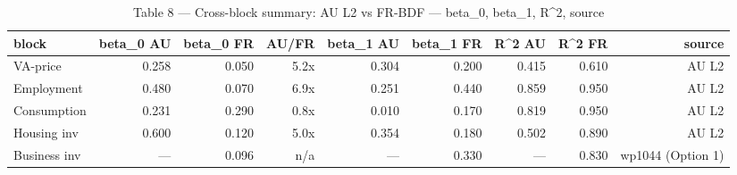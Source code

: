 \begin{table}[ht]
\centering
\caption{Table 8 — Cross-block summary: AU L2 vs FR-BDF — beta_0, beta_1, R^2, source}
\begin{tabular}{lrrrrrrrr}
\toprule
block & beta_0 AU & beta_0 FR & AU/FR & beta_1 AU & beta_1 FR & R^2 AU & R^2 FR & source \\
\midrule
VA-price & 0.258 & 0.050 & 5.2x & 0.304 & 0.200 & 0.415 & 0.610 & AU L2 \\
Employment & 0.480 & 0.070 & 6.9x & 0.251 & 0.440 & 0.859 & 0.950 & AU L2 \\
Consumption & 0.231 & 0.290 & 0.8x & 0.010 & 0.170 & 0.819 & 0.950 & AU L2 \\
Housing inv & 0.600 & 0.120 & 5.0x & 0.354 & 0.180 & 0.502 & 0.890 & AU L2 \\
Business inv & — & 0.096 & n/a & — & 0.330 & — & 0.830 & wp1044 (Option 1) \\
\bottomrule
\end{tabular}
\end{table}
